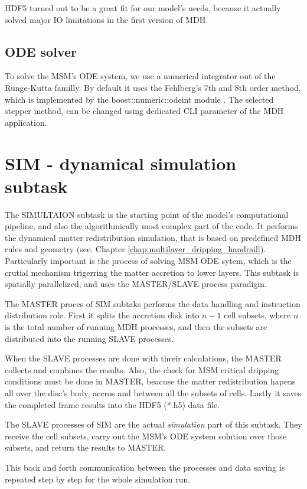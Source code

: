     HDF5 turned out to be a great fit for our model's needs, because it actually solved major IO limitations in the first version of MDH.

\subsection{ODE solver}
    To solve the MSM's ODE system, we use a numerical integrator out of the Runge-Kutta familly. By default it uses the Fehlberg's 7th and 8th order method, which is implemented by the boost::numeric::odeint module \citep{boost_2007}. The selected stepper method, can be changed using dedicated CLI parameter of the MDH application. 


\section{SIM - dynamical simulation subtask}
    The SIMULTAION subtask is the starting point of the model's computational pipeline, and also the algorithmically most complex part of the code. It performs the dynamical matter redistribution simulation, that is based on predefined MDH rules and geometry (see. Chapter \ref{chap:multilayer_dripping_handrail}). Particularly important is the process of solving MSM ODE sytem, which is the crutial mechanism trigerring the matter accretion to lower layers. This subtask is spatially parallelized, and uses the MASTER/SLAVE process paradigm. 

    The MASTER proces of SIM subtaks performs the data handling and instruction distribution role. First it splits the accretion disk into $n-1$ cell subsets, where $n$ is the total number of running MDH processes, and then the subsets are distributed into the running SLAVE processes.

    When the SLAVE processes are done with threir calculations, the MASTER collects and combines the results. Also, the check for MSM critical dripping conditions must be done in MASTER, beacuse the matter redistribution hapens all over the disc's body, accros and between all the subsets of cells. Lastly it saves the completed frame results into the HDF5 (*.h5) data file. 

    The SLAVE processes of SIM are the actual \emph{simulation} part of this subtask. They receive the cell subsets, carry out the MSM's ODE system solution over those subsets, and return the results to MASTER. 

    This back and forth communication between the processes and data saving is repeated step by step for the whole simulation run. 

